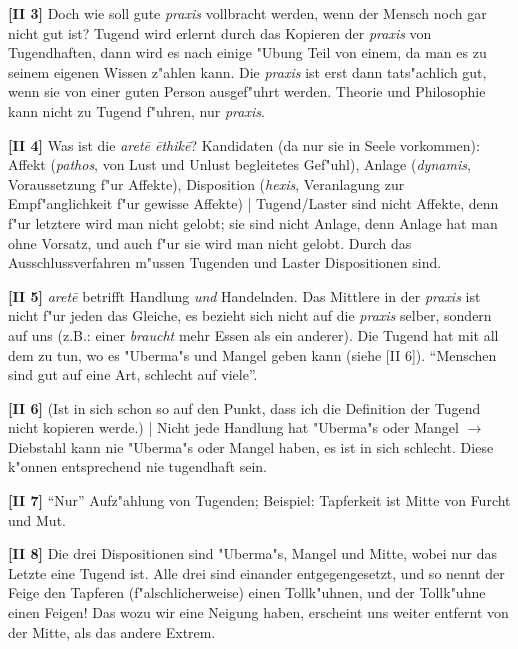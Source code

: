 \documentclass[emulatestandardclasses]{scrartcl}
\begin{document}
\noindent \textbf{[II 3]} Doch wie soll gute \emph{praxis} vollbracht werden, wenn der Mensch noch gar nicht gut ist? Tugend wird erlernt durch das Kopieren der \emph{praxis} von Tugendhaften, dann wird es nach einige "Ubung Teil von einem, da man es zu seinem eigenen Wissen z"ahlen kann. Die \emph{praxis} ist erst dann tats"achlich gut, wenn sie von einer guten Person ausgef"uhrt werden. Theorie und Philosophie kann nicht zu Tugend f"uhren, nur \emph{praxis}.\newline

\noindent \textbf{[II 4]} Was ist die \emph{aret\={e} \={e}thik\={e}}? Kandidaten (da nur sie in Seele vorkommen): Affekt (\emph{pathos}, von Lust und Unlust begleitetes Gef"uhl), Anlage (\emph{dynamis}, Voraussetzung f"ur Affekte), Disposition (\emph{hexis}, Veranlagung zur Empf"anglichkeit f"ur gewisse Affekte) | Tugend/Laster sind nicht Affekte, denn f"ur letztere wird man nicht gelobt; sie sind nicht Anlage, denn Anlage hat man ohne Vorsatz, und auch f"ur sie wird man nicht gelobt. Durch das Ausschlussverfahren m"ussen Tugenden und Laster Dispositionen sind. \newline

\noindent \textbf{[II 5]} \emph{aret\={e}} betrifft Handlung \emph{und} Handelnden. Das Mittlere in der \emph{praxis} ist nicht f"ur jeden das Gleiche, es bezieht sich nicht auf die \emph{praxis} selber, sondern auf uns (z.B.: einer \emph{braucht} mehr Essen als ein anderer). Die Tugend hat mit all dem zu tun, wo es "Uberma"s und Mangel geben kann (siehe [II 6]). "`Menschen sind gut auf eine Art, schlecht auf viele"'. \newline

\noindent \textbf{[II 6]} (Ist in sich schon so auf den Punkt, dass ich die Definition der Tugend nicht kopieren werde.) | Nicht jede Handlung hat "Uberma"s oder Mangel $\rightarrow$ Diebstahl kann nie "Uberma"s oder Mangel haben, es ist in sich schlecht. Diese k"onnen entsprechend nie tugendhaft sein.\newline

\noindent \textbf{[II 7]} "`Nur"' Aufz"ahlung von Tugenden; Beispiel: Tapferkeit ist Mitte von Furcht und Mut.\newline

\noindent \textbf{[II 8]} Die drei Dispositionen sind "Uberma"s, Mangel und Mitte, wobei nur das Letzte eine Tugend ist. Alle drei sind einander entgegengesetzt, und so nennt der Feige den Tapferen (f"alschlicherweise) einen Tollk"uhnen, und der Tollk"uhne einen Feigen! Das wozu wir eine Neigung haben, erscheint uns weiter entfernt von der Mitte, als das andere Extrem.\newline
\end{document}
